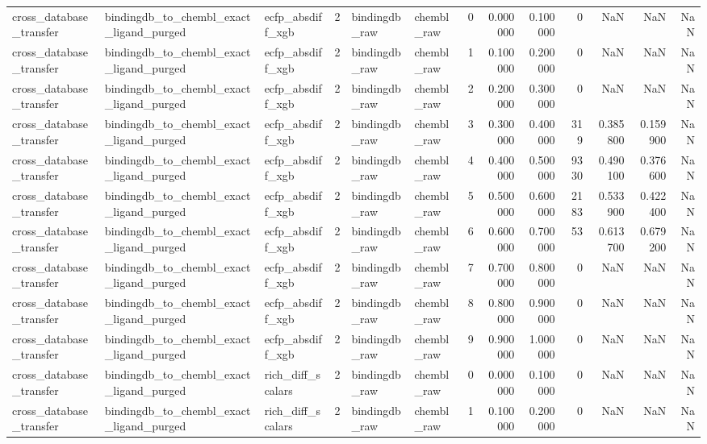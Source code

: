 \begin{longtable}{lllrllrrrrrrr}
cross\_database\_transfer & bindingdb\_to\_chembl\_exact\_ligand\_purged & ecfp\_absdiff\_xgb & 2 & bindingdb\_raw & chembl\_raw & 0 & 0.000000 & 0.100000 & 0 & NaN & NaN & NaN \\
cross\_database\_transfer & bindingdb\_to\_chembl\_exact\_ligand\_purged & ecfp\_absdiff\_xgb & 2 & bindingdb\_raw & chembl\_raw & 1 & 0.100000 & 0.200000 & 0 & NaN & NaN & NaN \\
cross\_database\_transfer & bindingdb\_to\_chembl\_exact\_ligand\_purged & ecfp\_absdiff\_xgb & 2 & bindingdb\_raw & chembl\_raw & 2 & 0.200000 & 0.300000 & 0 & NaN & NaN & NaN \\
cross\_database\_transfer & bindingdb\_to\_chembl\_exact\_ligand\_purged & ecfp\_absdiff\_xgb & 2 & bindingdb\_raw & chembl\_raw & 3 & 0.300000 & 0.400000 & 319 & 0.385800 & 0.159900 & NaN \\
cross\_database\_transfer & bindingdb\_to\_chembl\_exact\_ligand\_purged & ecfp\_absdiff\_xgb & 2 & bindingdb\_raw & chembl\_raw & 4 & 0.400000 & 0.500000 & 9330 & 0.490100 & 0.376600 & NaN \\
cross\_database\_transfer & bindingdb\_to\_chembl\_exact\_ligand\_purged & ecfp\_absdiff\_xgb & 2 & bindingdb\_raw & chembl\_raw & 5 & 0.500000 & 0.600000 & 2183 & 0.533900 & 0.422400 & NaN \\
cross\_database\_transfer & bindingdb\_to\_chembl\_exact\_ligand\_purged & ecfp\_absdiff\_xgb & 2 & bindingdb\_raw & chembl\_raw & 6 & 0.600000 & 0.700000 & 53 & 0.613700 & 0.679200 & NaN \\
cross\_database\_transfer & bindingdb\_to\_chembl\_exact\_ligand\_purged & ecfp\_absdiff\_xgb & 2 & bindingdb\_raw & chembl\_raw & 7 & 0.700000 & 0.800000 & 0 & NaN & NaN & NaN \\
cross\_database\_transfer & bindingdb\_to\_chembl\_exact\_ligand\_purged & ecfp\_absdiff\_xgb & 2 & bindingdb\_raw & chembl\_raw & 8 & 0.800000 & 0.900000 & 0 & NaN & NaN & NaN \\
cross\_database\_transfer & bindingdb\_to\_chembl\_exact\_ligand\_purged & ecfp\_absdiff\_xgb & 2 & bindingdb\_raw & chembl\_raw & 9 & 0.900000 & 1.000000 & 0 & NaN & NaN & NaN \\
cross\_database\_transfer & bindingdb\_to\_chembl\_exact\_ligand\_purged & rich\_diff\_scalars & 2 & bindingdb\_raw & chembl\_raw & 0 & 0.000000 & 0.100000 & 0 & NaN & NaN & NaN \\
cross\_database\_transfer & bindingdb\_to\_chembl\_exact\_ligand\_purged & rich\_diff\_scalars & 2 & bindingdb\_raw & chembl\_raw & 1 & 0.100000 & 0.200000 & 0 & NaN & NaN & NaN \\

\end{longtable}
